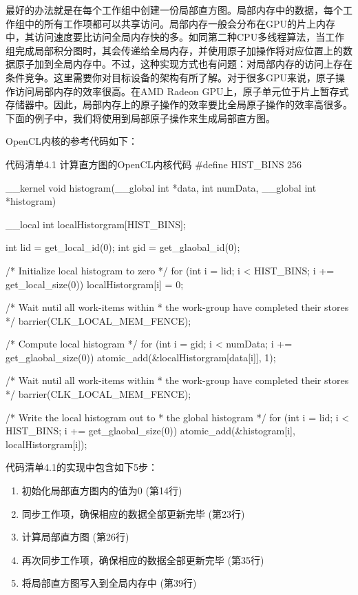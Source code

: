 最好的办法就是在每个工作组中创建一份局部直方图。局部内存中的数据，每个工作组中的所有工作项都可以共享访问。局部内存一般会分布在GPU的片上内存中，其访问速度要比访问全局内存快的多。如同第二种CPU多线程算法，当工作组完成局部积分图时，其会传递给全局内存，并使用原子加操作将对应位置上的数据原子加到全局内存中。不过，这种实现方式也有问题：对局部内存的访问上存在条件竞争。这里需要你对目标设备的架构有所了解。对于很多GPU来说，原子操作访问局部内存的效率很高。在AMD Radeon GPU上，原子单元位于片上暂存式存储器中。因此，局部内存上的原子操作的效率要比全局原子操作的效率高很多。下面的例子中，我们将使用到局部原子操作来生成局部直方图。

OpenCL内核的参考代码如下：

\begin{codeboxt}[cpp]{代码清单4.1 计算直方图的OpenCL内核代码}
#define HIST_BINS 256

__kernel
void histogram(__global int *data,
                        int  numData,
               __global int *histogram){

  __local int localHistorgram[HIST_BINS];

  int lid = get_local_id(0);
  int gid = get_glaobal_id(0);

  /* Initialize local histogram to zero */
  for (int i = lid; i < HIST_BINS; i += get_local_size(0)){
    localHistorgram[i] = 0;
  }

  /* Wait nutil all work-items within
   * the work-group have completed their stores */
  barrier(CLK_LOCAL_MEM_FENCE);

  /* Compute local histogram */
  for (int i = gid; i < numData; i += get_glaobal_size(0)){
    atomic_add(&localHistorgram[data[i]], 1);
  }

  /* Wait nutil all work-items within
   * the work-group have completed their stores */
  barrier(CLK_LOCAL_MEM_FENCE);

  /* Write the local histogram out to
   * the global histogram */
  for (int i = lid; i < HIST_BINS; i += get_glaobal_size(0)){
    atomic_add(&histogram[i], localHistorgram[i]);
  }
}
\end{codeboxt}

代码清单4.1的实现中包含如下5步：

\begin{enumerate}
\item 初始化局部直方图内的值为0 (第14行)
\item 同步工作项，确保相应的数据全部更新完毕 (第23行)
\item 计算局部直方图 (第26行)
\item 再次同步工作项，确保相应的数据全部更新完毕 (第35行)
\item 将局部直方图写入到全局内存中 (第39行)
\end{enumerate}

